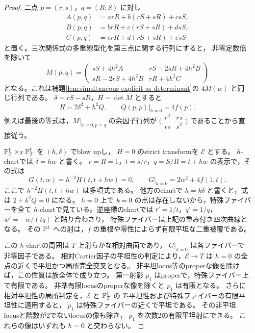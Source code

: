 \begin{proof}
二点 $p=(r:s)$，$q=(R:S)$ に対し
\[
 \begin{split}
 A(p,q)&=a rR+b(rS+sR)+c sS,\\
 B(p,q)&=b rR+c(rS+sR)+d sS,\\
 C(p,q)&=c rR+d(rS+sR)+e sS
 \end{split}
\]
と置く。三次関係式の多重線型化を第三点に関する行列にすると，
非零定数倍を除いて
\begin{equation}\label{eq:all-quartic-point-matrix}
 M(p,q)=
 \begin{pmatrix}
 sS+4h^2A&rS-2sR+4h^2B\\
 sR-2rS+4h^2B&rR+4h^2C
 \end{pmatrix}
\end{equation}
となる。これは補題\ref{lem:simultaneous-explicit-as-determinant}の
$4M(w)$ と同じ行列である。
$\delta=rS-sR$，$H=\det M$ とすると
\begin{equation}\label{eq:all-quartic-blowup-equation}
 H=2\delta^2+h^2Q,
 \qquad Q(p,p)|_{h=0}=4f(p).
\end{equation}
例えば最後の等式は，$M|_{h=0,p=q}$ の余因子行列が
$\bigl(\begin{smallmatrix}r^2&rs\\rs&s^2\end{smallmatrix}\bigr)$
であることから直接従う。

$\mathbb P^1_T\times_T\mathbb P^1_T$ を $(h,\delta)$ でblow upし，
$H=0$ のstrict transformを $\mathcal E$ とする。
$h$-chartでは $\delta=hw$ と書く。
$r=R=1$，$t=s/r$，$q=S/R=t+hw$ の表示で，その式は
\[
 G(t,w)=h^{-2}H(t,t+hw)=0,
 \qquad G|_{h=0}=2w^2+4f(1,t).
\]
ここで $h^{-2}H(t,t+hw)$ は多項式である。
他方のchartで $h=k\delta$ と書くと，式は $2+k^2Q=0$ になる。
$h=0$ 上で $k=0$ の点は存在しないから，特殊ファイバーを全て
$h$-chartで見ている。逆座標のchartでは
$t'=1/t$，$q'=1/q$，$w'=-w/(tq)$ と貼り合わさり，
特殊ファイバーは上記の重み付き四次曲線となる。
その $\mathbb P^1$ への射は，$f$ の重根や零性によらず有限平坦な二重被覆である。

この $h$-chartの周囲は $T$ 上滑らかな相対曲面であり，
$G|_{h=0}$ は各ファイバーで非零因子である。
相対Cartier因子の平坦性の判定により，$\mathcal E\to T$ は
$h=0$ の全点の近くで平坦かつ局所完全交叉となる。
非平坦locus等のproperな像を除けば，この性質は族全体で成り立つ。
第一射影 $p_1$ はproperで，特殊ファイバー上で有限である。
非準有限locusのproperな像を除くと $p_1$ は有限となる。
さらに相対平坦性の局所判定を，$\mathcal E$ と $\mathbb P^1_T$ の
$T$-平坦性および特殊ファイバーの有限平坦性に適用すると，
$p_1$ は特殊ファイバーの近くで平坦である。
その非平坦locusと階数が2でないlocusの像も除き，
$p_1$ を次数2の有限平坦射にできる。
これらの像はいずれも $h=0$ と交わらない。


\end{proof}
